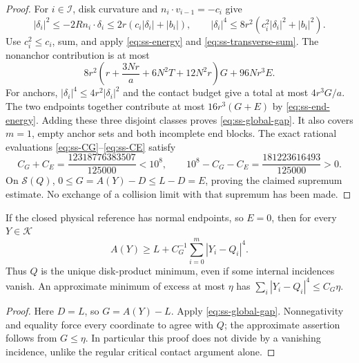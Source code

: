 \begin{proof}
For $i\in\mathcal I$, disk curvature and
$n_i\cdot v_{i-1}=-c_i$ give
\[
 |\delta_i|^2\le-2R n_i\cdot\delta_i
 \le2r(c_i|\delta_i|+|b_i|),\qquad
 |\delta_i|^4\le8r^2(c_i^2|\delta_i|^2+|b_i|^2).
\]
Use $c_i^2\le c_i$, sum, and apply \eqref{eq:ss-energy} and
\eqref{eq:ss-transverse-sum}. The nonanchor contribution is at most
\[
 8r^2\left(r+\frac{3Nr}{a}+6N^2T+12N^2r\right)G+96Nr^3E.
\]
For anchors, $|\delta_i|^4\le4r^2|\delta_i|^2$ and the contact
budget give a total at most $4r^3G/a$. The two endpoints together
contribute at most $16r^3(G+E)$ by \eqref{eq:ss-end-energy}.
Adding these three disjoint classes proves \eqref{eq:ss-global-gap}.
It also covers $m=1$, empty anchor sets and both incomplete end blocks.
The exact rational evaluations \eqref{eq:ss-CG}--\eqref{eq:ss-CE}
satisfy
\[
 C_G+C_E=\frac{12318776383507}{125000}<10^8,
 \qquad 10^8-C_G-C_E=\frac{181223616493}{125000}>0.
\]
On $\mathcal S(Q)$, $0\le G=A(Y)-D\le L-D=E$, proving the
claimed supremum estimate. No exchange of a collision limit with that
supremum has been made.
\end{proof}

\begin{corollary}
\label{cor:ss-critical-closure}
If the closed physical reference has normal endpoints, so $E=0$,
then for every $Y\in\mathcal K$
\begin{equation}\label{eq:ss-critical-coercivity}
 A(Y)\ge L+C_G^{-1}\sum_{i=0}^m|Y_i-Q_i|^4.
\end{equation}
Thus $Q$ is the unique disk-product minimum, even if some internal
incidences vanish. An approximate minimum of excess at most $\eta$
has $\sum_i|Y_i-Q_i|^4\le C_G\eta$.
\end{corollary}
\begin{proof}
Here $D=L$, so $G=A(Y)-L$. Apply
\eqref{eq:ss-global-gap}. Nonnegativity and equality force every
coordinate to agree with $Q$; the approximate assertion follows from
$G\le\eta$. In particular this proof does not divide by a vanishing
incidence, unlike the regular critical contact argument alone.
\end{proof}

